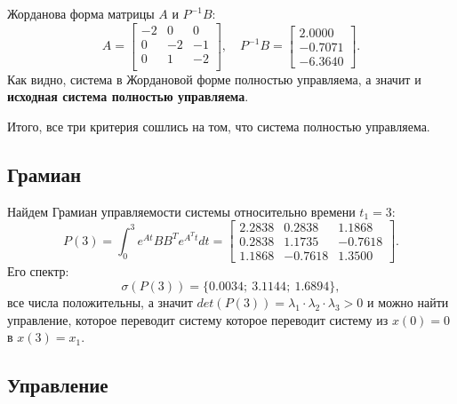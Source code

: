Жорданова форма матрицы $A$ и $P^{-1}B$:
\begin{equation*}
    A =\begin{bmatrix}
        
-2&	   0&	   0\\
0&	  -2&	   -1\\
0&	   1&	  -2\\

    \end{bmatrix},\quad
    P^{-1}B=\begin{bmatrix}
        2.0000 \\ -0.7071 \\ -6.3640
    \end{bmatrix}.
\end{equation*}
Как видно, система в Жордановой форме полностью управляема, а значит и \textbf{исходная система
полностью управляема}.

Итого, все три критерия сошлись на том, что система полностью управляема.

\subsection{Грамиан}

Найдем Грамиан управляемости системы относительно времени $t_1=3$:
\begin{equation*}
    P(3)=\int_{0}^{3}e^{At}BB^Te^{A^Tt}dt=
    \begin{bmatrix}
        2.2838  &  0.2838  &  1.1868 \\
        0.2838   & 1.1735  & -0.7618 \\
        1.1868  & -0.7618  &  1.3500
    \end{bmatrix}.
\end{equation*}
Его спектр:
\begin{equation*}
    \sigma(P(3))=\{ 0.0034;\ 
    3.1144;\ 
    1.6894\},
\end{equation*}
все числа положительны, а значит $det(P(3))=\lambda_1\cdot\lambda_2\cdot\lambda_3>0$ и
можно найти управление, которое переводит систему которое переводит систему из $x(0)=0$ в $x(3) = x_1$.

\subsection{Управление}

